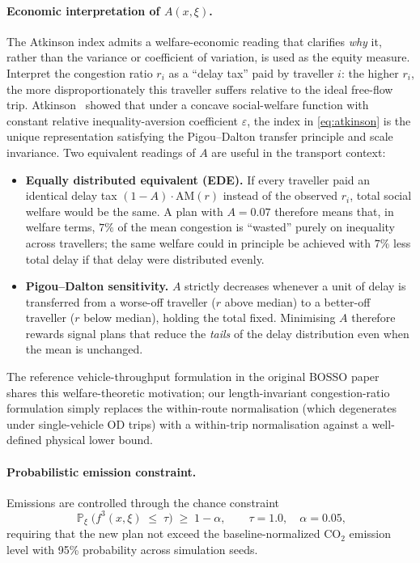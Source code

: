 \documentclass[12pt]{article}
\theoremstyle{plain}
\theoremstyle{definition}
\theoremstyle{remark}
\DeclareMathOperator{\Prob}{\mathbb{P}}
\begin{document}
\paragraph{Economic interpretation of $A(x,\xi)$.}
The Atkinson index admits a welfare-economic reading that clarifies
\emph{why} it, rather than the variance or coefficient of variation, is
used as the equity measure.  Interpret the congestion ratio $r_{i}$ as
a ``delay tax'' paid by traveller $i$: the higher $r_{i}$, the more
disproportionately this traveller suffers relative to the ideal
free-flow trip.  Atkinson~\citep{Atkinson1970} showed that under a
concave social-welfare function with constant relative
inequality-aversion coefficient $\varepsilon$, the index in
\eqref{eq:atkinson} is the unique representation satisfying the
Pigou--Dalton transfer principle and scale invariance.  Two equivalent
readings of $A$ are useful in the transport context:
\begin{itemize}
  \item \textbf{Equally distributed equivalent (EDE).}  If every
  traveller paid an identical delay tax $(1-A)\cdot\mathrm{AM}(r)$
  instead of the observed $r_{i}$, total social welfare would be the
  same.  A plan with $A=0.07$ therefore means that, in welfare terms,
  $7\%$ of the mean congestion is ``wasted'' purely on inequality
  across travellers; the same welfare could in principle be achieved
  with $7\%$ less total delay if that delay were distributed evenly.
  \item \textbf{Pigou--Dalton sensitivity.}  $A$ strictly decreases
  whenever a unit of delay is transferred from a worse-off traveller
  ($r$ above median) to a better-off traveller ($r$ below median),
  holding the total fixed.  Minimising $A$ therefore rewards signal
  plans that reduce the \emph{tails} of the delay distribution even
  when the mean is unchanged.
\end{itemize}
The reference vehicle-throughput formulation in the original BOSSO
paper~\citep{ZhengXueXuRan2019a} shares this welfare-theoretic motivation;
our length-invariant congestion-ratio formulation simply replaces the
within-route normalisation (which degenerates under single-vehicle OD
trips) with a within-trip normalisation against a well-defined physical
lower bound.

\paragraph{Probabilistic emission constraint.}
Emissions are controlled through the chance constraint
\begin{equation}\label{eq:intas_constraint}
  \Prob_{\xi}\!\bigl(f^{3}(x,\xi)\;\le\;\tau\bigr)
  \;\ge\; 1-\alpha,
  \qquad \tau=1.0,\quad\alpha=0.05,
\end{equation}
requiring that the new plan not exceed the baseline-normalized CO$_{2}$
emission level with 95\% probability across simulation seeds.
\end{document}
